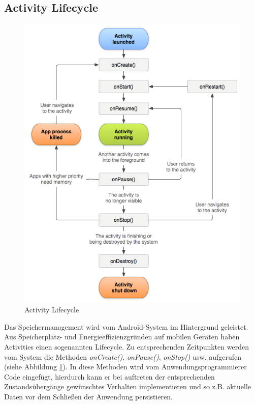 \subsection{Activity Lifecycle}
\label{sec:activity_lifecycle}
\begin{figure}[ht]
\centering
\includegraphics[width=\textwidth]{../img/ActivityLifecycle.png}
\caption{Activity Lifecycle \cite{_activity_2016}}
\label{fig:activitylifecycle}
\end{figure}

Das Speichermanagement wird vom Android-System im Hintergrund geleistet. Aus Speicherplatz- und Energieeffizienzgründen auf mobilen Geräten haben Activities einen sogenannten Lifecycle. Zu entsprechenden Zeitpunkten werden vom System die Methoden \emph{onCreate()}, \emph{onPause()}, \emph{onStop()} usw. aufgerufen (siehe Abbildung \ref{fig:activitylifecycle}). In diese Methoden wird vom Anwendungsprogrammierer Code eingefügt, hierdurch kann er bei auftreten der entsprechenden Zustandsübergänge gewünschtes Verhalten implementieren und so z.B. aktuelle Daten vor dem Schließen der Anwendung persistieren.


